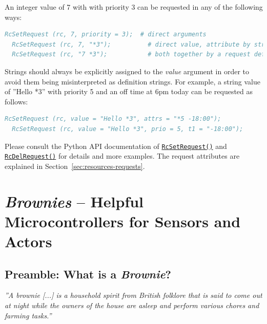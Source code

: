 \documentclass[12pt,english,parskip=half,headheight=19pt]{scrreprt}
\newcommand{\refapic}[1]{\href{home2l-api_c/index.html}{\mbox{\texttt{#1}}}}            %
\newcommand{\refapipython}[1]{\href{home2l-api_python/index.html}{\mbox{\texttt{#1}}}}  %
\begin{document}
An integer value of 7 with with priority 3 can be requested in any of the following ways:
\begin{lstlisting}[language=comments]
  RcSetRequest (rc, 7, priority = 3);  # direct arguments
  RcSetRequest (rc, 7, "*3");          # direct value, attribute by string
  RcSetRequest (rc, "7 *3");           # both together by a request definition string
\end{lstlisting}

Strings should always be explicitly assigned to the \textit{value} argument in order to avoid them being misinterpreted as definition strings. For example, a string value of ''Hello *3'' with priority 5 and an off time at 6pm today can be requested as follows:
\begin{lstlisting}[language=comments]
  RcSetRequest (rc, value = "Hello *3", attrs = "*5 -18:00");
  RcSetRequest (rc, value = "Hello *3", prio = 5, t1 = "-18:00");
\end{lstlisting}

Please consult the Python API documentation of \refapipython{RcSetRequest()} and \refapic{RcDelRequest()} for details and more examples. The request attributes are explained in Section~\ref{sec:resources-requests}.





%
\chapter{\textit{Brownies} -- Helpful Microcontrollers for Sensors and Actors}
\label{ch:brownies}
%



\section{Preamble: What is a \textit{Brownie}?}
\label{sec:brownies-preamble}


\textit{''A brownie [...] is a household spirit from British folklore that is said to come out at night while the owners of the house are asleep and perform various chores and farming tasks.''} \break
[\href{https://en.wikipedia.org/w/index.php?title=Brownie_(folklore)&oldid=929557103}{Wikipedia: Brownie (folklore)}]
\end{document}
